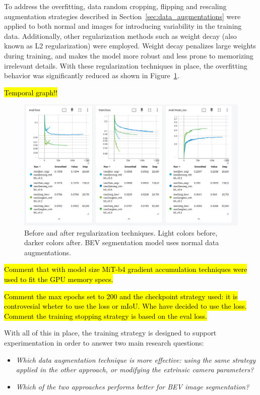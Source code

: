 To address the overfitting, data random cropping, flipping and rescaling augmentation strategies described in Section~\ref{sec:data_augmentations} were applied to both normal and  images for introducing variability in the training data. Additionally, other regularization methods such as weight decay (also known as L2 regularization) were employed. Weight decay penalizes large weights during training, and makes the model more robust and less prone to memorizing irrelevant details. With these regularization techniques in place, the overfitting behavior was significantly reduced as shown in Figure~\ref{fig:before_after_data_aug}.

\hl{Temporal graph!!}
\begin{figure}[h!]
    \centering
    \includegraphics[width=0.7\linewidth]{./images/experiments/before_an_after_data_aug.png}
    \caption{Before and after regularization techniques. Light colors before, darker colors after. BEV segmentation model uses normal data augmentations.}
    \label{fig:before_after_data_aug}
\end{figure}

\hl{Comment that with model size MiT-b4 gradient accumulation techniques were used to fit the GPU memory specs.}

\hl{Comment the max epochs set to 200 and the checkpoint strategy used: it is controvesial wheter to use the loss or mIoU. Whe have decided to use the loss.}
\hl{Comment the training stopping strategy is based on the eval loss.}

With all of this in place, the training strategy is designed to support experimentation in order to answer two main research questions:

\begin{itemize}
    \item \textit{Which data augmentation technique is more effective: using the same strategy applied in the other approach, or modifying the extrinsic camera parameters?}
    \item \textit{Which of the two approaches performs better for BEV image segmentation?}
\end{itemize}

